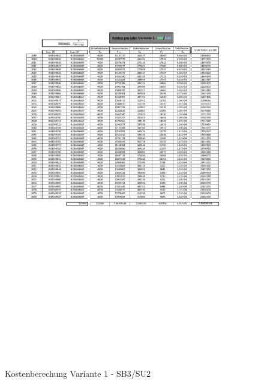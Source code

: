 \begin{figure}[h!]
	\centering
	\includegraphics[width=\textwidth]{figures/Anhang/f-00-A-V1-B3-U2}
	\caption{Kostenberechung Variante 1 - SB3/SU2}
\end{figure}

